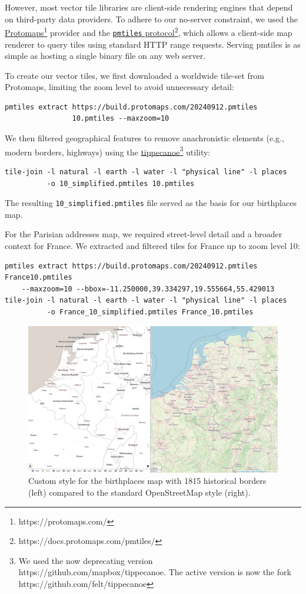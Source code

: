 \documentclass[final]{anthology-ch} %
\begin{document}
However, most vector tile libraries are client-side rendering engines that depend on third-party data providers. To adhere to our no-server constraint, we used the \href{https://protomaps.com/}{Protomaps}\footnote{https://protomaps.com/} provider and the \href{https://docs.protomaps.com/pmtiles/}{\texttt{pmtiles} protocol}\footnote{https://docs.protomaps.com/pmtiles/}, which allows a client-side map renderer to query tiles using standard HTTP range requests. Serving pmtiles is as simple as hosting a single binary file on any web server.

To create our vector tiles, we first downloaded a worldwide tile-set from Protomaps, limiting the zoom level to avoid unnecessary detail:
\begin{verbatim}
pmtiles extract https://build.protomaps.com/20240912.pmtiles
                10.pmtiles --maxzoom=10
\end{verbatim}
We then filtered geographical features to remove anachronistic elements (e.g., modern borders, highways) using the \href{https://github.com/felt/tippecanoe}{tippecanoe}\footnote{We used the now deprecating version https://github.com/mapbox/tippecanoe. The active version is now the fork https://github.com/felt/tippecanoe} utility:
\begin{verbatim}
tile-join -l natural -l earth -l water -l "physical line" -l places
          -o 10_simplified.pmtiles 10.pmtiles
\end{verbatim}
The resulting \texttt{10\_simplified.pmtiles} file served as the basis for our birthplaces map.

For the Parisian addresses map, we required street-level detail and a broader context for France. We extracted and filtered tiles for France up to zoom level 10:
\begin{verbatim}
pmtiles extract https://build.protomaps.com/20240912.pmtiles France10.pmtiles
    --maxzoom=10 --bbox=-11.250000,39.334297,19.555664,55.429013
tile-join -l natural -l earth -l water -l "physical line" -l places
          -o France_10_simplified.pmtiles France_10.pmtiles
\end{verbatim}

\begin{figure}[t!]
  \centering
  \includegraphics[width=1\linewidth]{figures/map_compared.png}
  \caption{Custom style for the birthplaces map with 1815 historical borders (left) compared to the standard OpenStreetMap style (right).}
  \label{fig:map_compared}
\end{figure}
\end{document}
